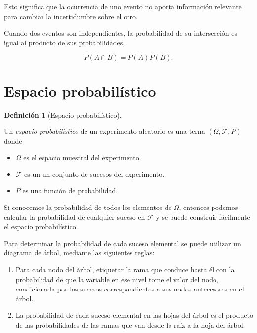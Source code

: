 \documentclass[
  a4paper,
]{scrreport}
\providecommand{\tightlist}{%
  \setlength{\itemsep}{0pt}\setlength{\parskip}{0pt}}\usepackage{longtable,booktabs,array}
\theoremstyle{plain}
\theoremstyle{definition}
\newtheorem{definition}{Definición}[chapter]
\theoremstyle{definition}
\theoremstyle{remark}
\begin{document}
Esto significa que la ocurrencia de uno evento no aporta información
relevante para cambiar la incertidumbre sobre el otro.

Cuando dos eventos son independientes, la probabilidad de su
intersección es igual al producto de sus probabilidades,

\[P(A\cap B) = P(A)P(B).\]

\section{Espacio probabilístico}\label{espacio-probabiluxedstico}

\begin{definition}[Espacio
probabilístico]\protect\hypertarget{def-espacio-probabilistico}{}\label{def-espacio-probabilistico}

Un \emph{espacio probabilístico} de un experimento aleatorio es una
terna \((\Omega,\mathcal{F},P)\) donde

\begin{itemize}
\tightlist
\item
  \(\Omega\) es el espacio muestral del experimento.
\item
  \(\mathcal{F}\) es un un conjunto de sucesos del experimento.
\item
  \(P\) es una función de probabilidad.
\end{itemize}

\end{definition}

Si conocemos la probabilidad de todos los elementos de \(\Omega\),
entonces podemos calcular la probabilidad de cualquier suceso en
\(\mathcal{F}\) y se puede construir fácilmente el espacio
probabilístico.

Para determinar la probabilidad de cada suceso elemental se puede
utilizar un diagrama de árbol, mediante las siguientes reglas:

\begin{enumerate}
\def\labelenumi{\arabic{enumi}.}
\item
  Para cada nodo del árbol, etiquetar la rama que conduce hasta él con
  la probabilidad de que la variable en ese nivel tome el valor del
  nodo, condicionada por los sucesos correspondientes a sus nodos
  antecesores en el árbol.
\item
  La probabilidad de cada suceso elemental en las hojas del árbol es el
  producto de las probabilidades de las ramas que van desde la raíz a la
  hoja del árbol.
\end{enumerate}
\end{document}
